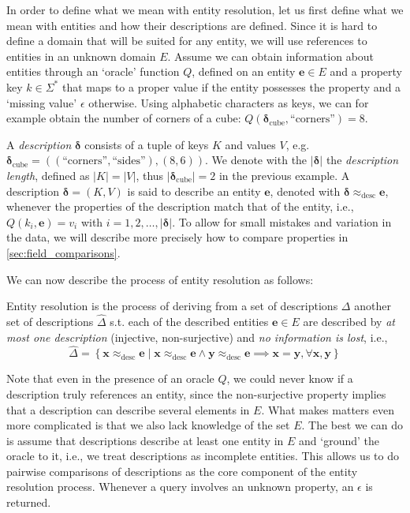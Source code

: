\documentclass{article}
\newcommand{\desc}{\bm\delta}  %
\newcommand{\descx}[1]{\bm{\delta}_\mathrm{#1}}  %
\newcommand{\entity}{\bm{e}}  %
\newcommand{\cardin}[1]{\left\vert #1 \right\vert}  %
\newcommand{\stringify}[1]{\ensuremath{\text{``#1''}}}
\newcommand{\describes}{\ensuremath{\approx_\mathrm{desc}}}
\begin{document}
In order to define what we mean with entity resolution, let us first define what we mean with entities and how their descriptions are defined.
Since it is hard to define a domain that will be suited for any entity, we will use references to entities in an unknown domain $E$.
Assume we can obtain information about entities through an `oracle' function $Q$, defined on an entity $\bm{e} \in E$ and a property key $k \in \Sigma^{*}$ that maps to a proper value if the entity possesses the property and a `missing value' $\epsilon$ otherwise.
Using alphabetic characters as keys, we can for example obtain the number of corners of a cube: $Q(\descx{cube}, \stringify{corners}) = 8$.

A \emph{description} $\desc$ consists of a tuple of keys $K$ and values $V$,
e.g. $\descx{cube}=((\stringify{corners}, \stringify{sides}), (8, 6))$.
We denote with the $\cardin{\desc}$ the \emph{description length}, defined as $\cardin{K}=\cardin{V}$, thus $\cardin{\descx{cube}}=2$ in the previous example.
A description $\desc = (K, V)$ is said to describe an entity $\entity$, denoted with $\desc \describes \entity$, whenever the properties of the description match that of the entity, i.e., $Q(k_i, \entity) = v_i$ with $i = 1, 2, \dots, \cardin{\desc}$.
To allow for small mistakes and variation in the data, we will describe more precisely how to compare properties in \cref{sec:field_comparisons}.

We can now describe the process of entity resolution as follows:

\begin{definition}
    Entity resolution is the process of deriving from a set of descriptions $\Delta$ another set of descriptions $\hat{\Delta}$ s.t. each of the described entities $\entity \in E$ are described by \emph{at most one description} (injective, non-surjective) and \emph{no information is lost}, i.e.,
    \begin{equation*}
        \hat{\Delta} = \left\{ \bm{x} \describes \entity \mid \bm{x} \describes \entity \wedge \bm{y} \describes \entity \implies \bm{x} = \bm{y}, \forall \bm{x}, \bm{y} \right\}
    \end{equation*}
\end{definition}

Note that even in the presence of an oracle $Q$, we could never know if a description truly references an entity, since the non-surjective property implies that a description can describe several elements in $E$.
What makes matters even more complicated is that we also lack knowledge of the set $E$.
The best we can do is assume that descriptions describe at least one entity in $E$ and `ground' the oracle to it, i.e., we treat descriptions as incomplete entities.
This allows us to do pairwise comparisons of descriptions as the core component of the entity resolution process.
Whenever a query involves an unknown property, an $\epsilon$ is returned.
\end{document}
